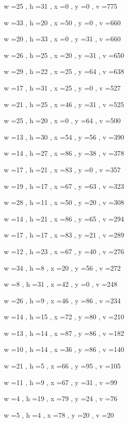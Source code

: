 \documentclass[11pt]{article}
\begin{document}
w =25 , h =31 , x =0 , y =0 , v =775
\par
w =33 , h =20 , x =50 , y =0 , v =660
\par
w =20 , h =33 , x =0 , y =31 , v =660
\par
w =26 , h =25 , x =20 , y =31 , v =650
\par
w =29 , h =22 , x =25 , y =64 , v =638
\par
w =17 , h =31 , x =25 , y =0 , v =527
\par
w =21 , h =25 , x =46 , y =31 , v =525
\par
w =25 , h =20 , x =0 , y =64 , v =500
\par
w =13 , h =30 , x =54 , y =56 , v =390
\par
w =14 , h =27 , x =86 , y =38 , v =378
\par
w =17 , h =21 , x =83 , y =0 , v =357
\par
w =19 , h =17 , x =67 , y =63 , v =323
\par
w =28 , h =11 , x =50 , y =20 , v =308
\par
w =14 , h =21 , x =86 , y =65 , v =294
\par
w =17 , h =17 , x =83 , y =21 , v =289
\par
w =12 , h =23 , x =67 , y =40 , v =276
\par
w =34 , h =8 , x =20 , y =56 , v =272
\par
w =8 , h =31 , x =42 , y =0 , v =248
\par
w =26 , h =9 , x =46 , y =86 , v =234
\par
w =14 , h =15 , x =72 , y =80 , v =210
\par
w =13 , h =14 , x =87 , y =86 , v =182
\par
w =10 , h =14 , x =36 , y =86 , v =140
\par
w =21 , h =5 , x =66 , y =95 , v =105
\par
w =11 , h =9 , x =67 , y =31 , v =99
\par
w =4 , h =19 , x =79 , y =24 , v =76
\par
w =5 , h =4 , x =78 , y =20 , v =20
\par
\newpage


\end{document}
